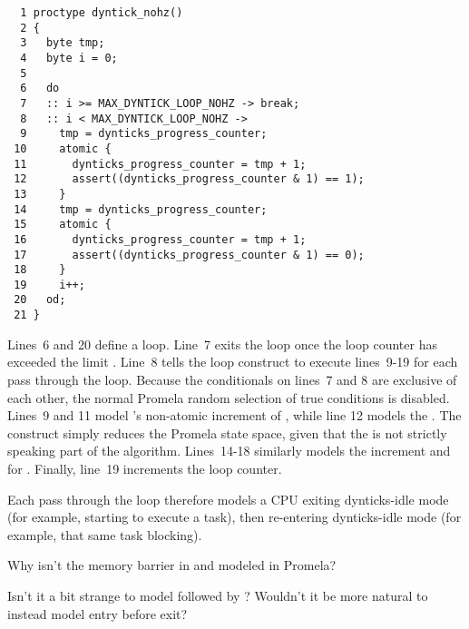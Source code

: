 { \scriptsize
\begin{verbatim}
  1 proctype dyntick_nohz()
  2 {
  3   byte tmp;
  4   byte i = 0;
  5
  6   do
  7   :: i >= MAX_DYNTICK_LOOP_NOHZ -> break;
  8   :: i < MAX_DYNTICK_LOOP_NOHZ ->
  9     tmp = dynticks_progress_counter;
 10     atomic {
 11       dynticks_progress_counter = tmp + 1;
 12       assert((dynticks_progress_counter & 1) == 1);
 13     }
 14     tmp = dynticks_progress_counter;
 15     atomic {
 16       dynticks_progress_counter = tmp + 1;
 17       assert((dynticks_progress_counter & 1) == 0);
 18     }
 19     i++;
 20   od;
 21 }
\end{verbatim}
}

Lines~6 and 20 define a loop.
Line~7 exits the loop once the loop counter 
has exceeded the limit .
Line~8 tells the loop construct to execute lines~9-19
for each pass through the loop.
Because the conditionals on lines~7 and 8 are exclusive of
each other, the normal Promela random selection of true conditions
is disabled.
Lines~9 and 11 model 's non-atomic
increment of , while
line 12 models the .
The  construct simply reduces the Promela state space,
given that the  is not strictly speaking part
of the algorithm.
Lines~14-18 similarly models the increment and
 for .
Finally, line~19 increments the loop counter.

Each pass through the loop therefore models a CPU exiting
dynticks-idle mode (for example, starting to execute a task), then
re-entering dynticks-idle mode (for example, that same task blocking).

\QuickQuiz{}
	Why isn't the memory barrier in 
	and  modeled in Promela?
 \QuickQuizEnd

\QuickQuiz{}
	Isn't it a bit strange to model 
	followed by ?
	Wouldn't it be more natural to instead model entry before exit?
 \QuickQuizEnd

